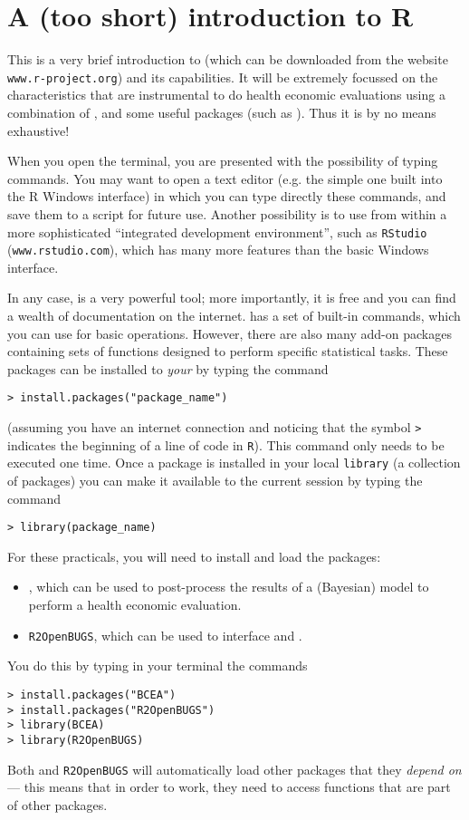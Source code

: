 \chapter{A (too short) introduction to R}

This is a very brief introduction to \R (which can be downloaded from the website \texttt{www.r-project.org}) and its capabilities. It will be extremely focussed on the characteristics that are instrumental to do health economic evaluations using a combination of \R, \bugs and some useful packages (such as \bcea). Thus it is by no means exhaustive!

When you open the \R terminal, you are presented with the possibility of typing commands. You may want to open a text editor (e.g. the simple one built into the R Windows interface) in which you can type directly these commands, and save them to a script for future use. Another possibility is to use \R from within a more sophisticated ``integrated development environment'', such as \texttt{RStudio} (\texttt{www.rstudio.com}), which has many more features than the basic Windows interface.

In any case, \R is a very powerful tool; more importantly, it is free and you can find a wealth of documentation on the internet. \R has a set of built-in commands, which you can use for basic operations. However, there are also many add-on packages containing sets of functions designed to perform specific statistical tasks. These packages can be installed to \textit{your} \R by typing the command
\begin{lstlisting}
> install.packages("package_name") 
\end{lstlisting}
(assuming you have an internet connection and noticing that the symbol \texttt{>} indicates the beginning of a line of code in \texttt{R}). This command only needs to be executed one time.  Once a package is installed in your local \texttt{library} (a collection of packages) you can make it available to the current \R session by typing the command
\begin{lstlisting}
> library(package_name)
\end{lstlisting}

For these practicals, you will need to install and load the packages:
\begin{itemize}
\item \bcea, which can be used to post-process the results of a (Bayesian) model to perform a health economic evaluation. 
\item \texttt{R2OpenBUGS}, which can be used to interface \R and \bugs.
\end{itemize} 
You do this by typing in your \R terminal the commands
\begin{lstlisting}
> install.packages("BCEA")
> install.packages("R2OpenBUGS")
> library(BCEA)
> library(R2OpenBUGS)
\end{lstlisting}
Both \bcea and \texttt{R2OpenBUGS} will automatically load other packages that they \textit{depend on} --- this means that in order to work, they need to access functions that are part of other packages.

